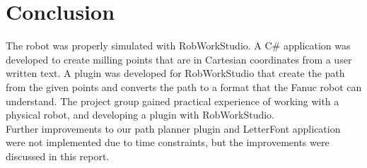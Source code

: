\section{Conclusion}
\label{sec:conclusion}

The robot was properly simulated with RobWorkStudio. A C\# application was developed to create milling points that are in Cartesian coordinates from a user written text. A plugin was developed for RobWorkStudio that create the path from the given points and converts the path to a format that the Fanuc robot can understand. The project group gained practical experience of working with a physical robot, and developing a plugin with RobWorkStudio. 
\\Further improvements to our path planner plugin and LetterFont application were not implemented due to time constraints, but the improvements were discussed in this report.
